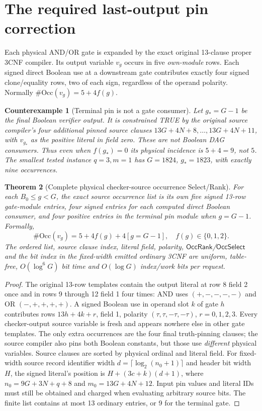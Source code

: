 \documentclass[11pt]{article}
\newtheorem{theorem}{Theorem}
\newtheorem{counterexample}[theorem]{Counterexample}
\begin{document}
\section{The required last-output pin correction}
Each physical AND/OR gate is expanded by the exact original 13-clause
proper 3CNF compiler. Its output variable $v_g$ occurs in five
\emph{own-module} rows. Each signed direct Boolean use at a downstream
gate contributes exactly four signed clone/equality rows, two of
each sign, regardless of the operand polarity. Normally
$\#\mathrm{Occ}(v_g)=5+4f(g)$.
\begin{counterexample}[Terminal pin is not a gate consumer]
Let $g_*=G-1$ be the final Boolean verifier output. It is constrained
TRUE by the original source compiler's 
\emph{four additional pinned source clauses}
$13G+4N+8,\ldots,13G+4N+11$, with $v_{g_*}$ as the positive literal
in field zero. These are not Boolean DAG consumers. Thus even when
$f(g_*)=0$ its physical incidence is $5+4=9$, not $5$.
The smallest tested instance $q=3,m=1$ has
$G=1824$, $g_*=1823$, with exactly nine occurrences.
\end{counterexample}
\begin{theorem}[Complete physical checker-source occurrence Select/Rank]
For each $B_0\le g<G$, the exact source occurrence list is its own
five signed 13-row gate-module entries, four signed entries for each
computed direct Boolean consumer, and \emph{four positive entries in the
terminal pin module when $g=G-1$}. Formally,
\[
 \boxed{\#\mathrm{Occ}(v_g)=5+4f(g)+4[g=G-1]},\quad
 f(g)\in\{0,1,2\}.
\tag{2}
\]
The ordered list, source clause index, literal field, polarity,
$\mathsf{OccRank}$/$\mathsf{OccSelect}$ and the bit index in the
fixed-width emitted ordinary 3CNF are uniform, table-free,
$O(\log^6 G)$ bit time and $O(\log G)$ index/work bits per request.
\end{theorem}
\begin{proof}
The original 13-row templates contain the output literal at
row 8 field 2 once and in rows 9 through 12 field 1 four times:
AND uses $(+,-,-,-,-)$ and OR $(-,+,+,+,+)$.
A signed Boolean use in operand slot $k$ of gate $h$ contributes
rows $13h+4k+r$, field 1, polarity $(\tau,\tau,-\tau,-\tau)$,
$r=0,1,2,3$. Every checker-output source variable is fresh and
appears nowhere else in other gate templates. The only extra
occurrences are the four final truth-pinning clauses; the source
compiler also pins both Boolean constants, but those use
\emph{different} physical variables. Source clauses are sorted by
physical ordinal and literal field. For fixed-width source record
identifier width $d=\lceil\log_2(n_0+1)\rceil$ and header bit width
$H$, the signed literal's position is $H+(3c+k)(d+1)$, where
$n_0=9G+3N+q+8$ and $m_0=13G+4N+12$.
Input pin values and literal IDs must still be obtained and charged
when evaluating arbitrary source bits. The finite list contains at
most 13 ordinary entries, or 9 for the terminal gate.
\end{proof}
\end{document}
